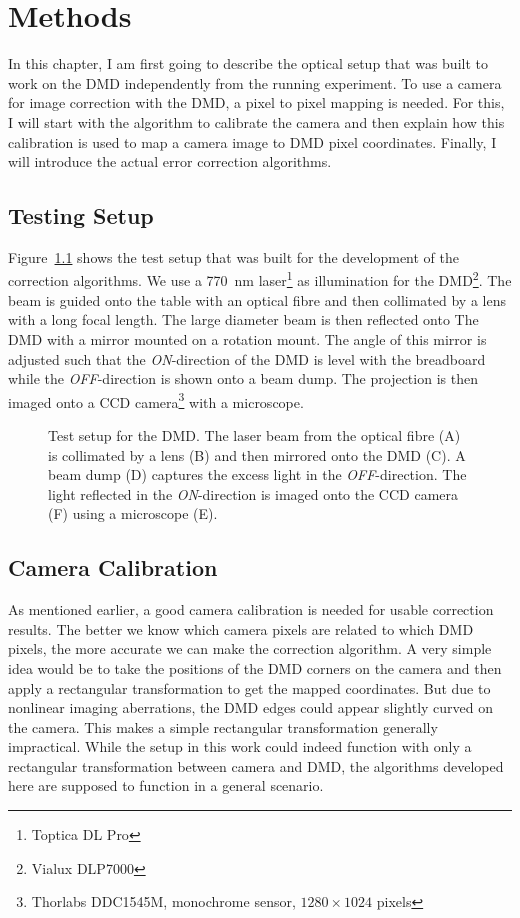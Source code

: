 

\chapter{Methods}
\label{cha:dmd_methods}
In this chapter, I am first going to describe the optical setup that was built to work on the DMD independently from the running experiment. To use a camera for image correction with the DMD, a pixel to pixel mapping is needed. For this, I will start with the algorithm to calibrate the camera and then explain how this calibration is used to map a camera image to DMD pixel coordinates. Finally, I will introduce the actual error correction algorithms.

\section{Testing Setup}
\label{sec:dmd_testing_setup}
Figure~\ref{fig:dmd_test_setup} shows the test setup that was built for the development of the correction algorithms. We use a \SI{770}{nm} laser\footnote{Toptica DL Pro} as illumination for the DMD\footnote{Vialux DLP7000}. The beam is guided onto the table with an optical fibre and then collimated by a lens with a long focal length. The large diameter beam is then reflected onto The DMD with a mirror mounted on a rotation mount. The angle of this mirror is adjusted such that the \emph{ON}-direction of the DMD is level with the breadboard while the \emph{OFF}-direction is shown onto a beam dump. The projection is then imaged onto a CCD camera\footnote{Thorlabs DDC1545M, monochrome sensor, $1280\times 1024$ pixels} with a microscope.
\begin{figure}[htbp]
    \centering
    
    \caption[Test setup for the DMD]{Test setup for the DMD. The laser beam from the optical fibre (A) is collimated by a lens (B) and then mirrored onto the DMD (C). A beam dump (D) captures the excess light in the \emph{OFF}-direction. The light reflected in the \emph{ON}-direction is imaged onto the CCD camera (F) using a microscope (E).}
    \label{fig:dmd_test_setup}
\end{figure}

\section{Camera Calibration}
\label{sec:dmd_camera_calibration}
As mentioned earlier, a good camera calibration is needed for usable correction results. The better we know which camera pixels are related to which DMD pixels, the more accurate we can make the correction algorithm. A very simple idea would be to take the positions of the DMD corners on the camera and then apply a rectangular transformation to get the mapped coordinates. But due to nonlinear imaging aberrations, the DMD edges could appear slightly curved on the camera. This makes a simple rectangular transformation generally impractical. While the setup in this work could indeed function with only a rectangular transformation between camera and DMD, the algorithms developed here are supposed to function in a general scenario.

